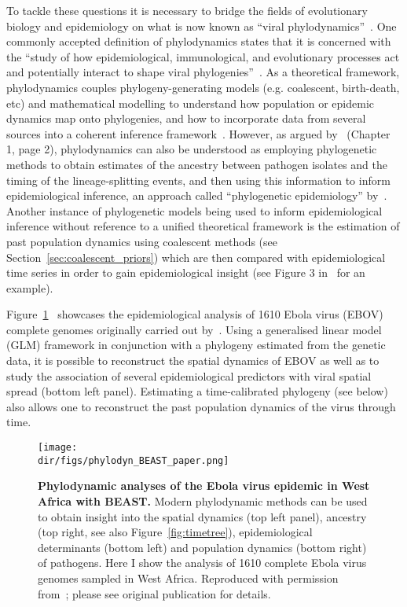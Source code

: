 To tackle these questions it is necessary to bridge the fields of evolutionary biology and epidemiology on what is now known as ``viral phylodynamics''~\citep{Grenfell2004,Volz2013,Pybus2013}.
One commonly accepted definition of phylodynamics states that it is concerned with the ``study of how epidemiological, immunological, and evolutionary processes act and potentially interact to shape viral phylogenies''~\citep{Grenfell2004}.
As a theoretical framework, phylodynamics couples phylogeny-generating models (e.g. coalescent, birth-death, etc) and mathematical modelling to understand how population or epidemic dynamics map onto phylogenies, and how to incorporate data from several sources into a coherent inference framework~\citep{Kuhnert2011}.
However, as argued by~\cite{Hall2015} (Chapter 1, page 2), phylodynamics can also be understood as employing phylogenetic methods to obtain estimates of the ancestry between pathogen isolates and the timing of the lineage-splitting events, and then using this information to inform epidemiological inference, an approach called ``phylogenetic epidemiology'' by~\cite{Kuhnert2011}.
Another instance of phylogenetic models being used to inform epidemiological inference without reference to a unified theoretical framework is the estimation of past population dynamics using coalescent methods (see Section~\ref{sec:coalescent_priors}) which are then compared with epidemiological time series in order to gain epidemiological insight (see Figure 3 in~\cite{Bennett2009} for  an example).

Figure~\ref{fig:phylodyn}~\citep{Suchard2018} showcases the epidemiological analysis of 1610 Ebola virus (EBOV) complete genomes originally carried out by~\citep{Dudas2017}.
Using a generalised linear model (GLM) framework in conjunction with a phylogeny estimated from the genetic data, it is possible to reconstruct the spatial dynamics of EBOV as well as to study the association of several epidemiological predictors with viral spatial spread (bottom left panel).
Estimating a time-calibrated phylogeny (see below) also allows one to reconstruct the past population dynamics of the virus through time. 

\begin{figure}[!ht]
\begin{center}
\texttt{[image: \\dir/figs/phylodyn\_BEAST\_paper.png]} 
\end{center}
 \caption[Phylodynamic analyses of the Ebola virus epidemic in West Africa with BEAST.]{\textbf{Phylodynamic analyses of the Ebola virus epidemic in West Africa with BEAST.}
 Modern phylodynamic methods can be used to obtain insight into the spatial dynamics (top left panel), ancestry (top right, see also Figure~\ref{fig:timetree}), epidemiological determinants (bottom left) and population dynamics (bottom right) of pathogens.
 Here I show the analysis of 1610 complete Ebola virus genomes sampled in West Africa.
 Reproduced with permission from~\cite{Suchard2018}; please see original publication for details.
 }
 \label{fig:phylodyn}
\end{figure}


